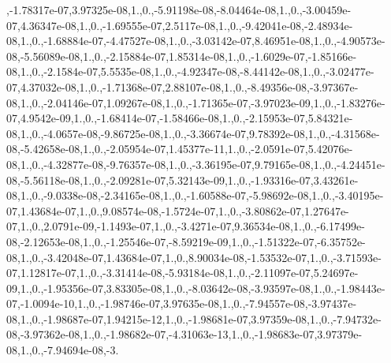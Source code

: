 \begin{DoxyCompactItemize}
,-\/1.\-78317e-\/07,3.\-97325e-\/08,1.,0.,-\/5.\-91198e-\/08,-\/8.\-04464e-\/08,1.,0.,-\/3.\-00459e-\/07,4.\-36347e-\/08,1.,0.,-\/1.\-69555e-\/07,2.\-5117e-\/08,1.,0.,-\/9.\-42041e-\/08,-\/2.\-48934e-\/08,1.,0.,-\/1.\-68884e-\/07,-\/4.\-47527e-\/08,1.,0.,-\/3.\-03142e-\/07,8.\-46951e-\/08,1.,0.,-\/4.\-90573e-\/08,-\/5.\-56089e-\/08,1.,0.,-\/2.\-15884e-\/07,1.\-85314e-\/08,1.,0.,-\/1.\-6029e-\/07,-\/1.\-85166e-\/08,1.,0.,-\/2.\-1584e-\/07,5.\-5535e-\/08,1.,0.,-\/4.\-92347e-\/08,-\/8.\-44142e-\/08,1.,0.,-\/3.\-02477e-\/07,4.\-37032e-\/08,1.,0.,-\/1.\-71368e-\/07,2.\-88107e-\/08,1.,0.,-\/8.\-49356e-\/08,-\/3.\-97367e-\/08,1.,0.,-\/2.\-04146e-\/07,1.\-09267e-\/08,1.,0.,-\/1.\-71365e-\/07,-\/3.\-97023e-\/09,1.,0.,-\/1.\-83276e-\/07,4.\-9542e-\/09,1.,0.,-\/1.\-68414e-\/07,-\/1.\-58466e-\/08,1.,0.,-\/2.\-15953e-\/07,5.\-84321e-\/08,1.,0.,-\/4.\-0657e-\/08,-\/9.\-86725e-\/08,1.,0.,-\/3.\-36674e-\/07,9.\-78392e-\/08,1.,0.,-\/4.\-31568e-\/08,-\/5.\-42658e-\/08,1.,0.,-\/2.\-05954e-\/07,1.\-45377e-\/11,1.,0.,-\/2.\-0591e-\/07,5.\-42076e-\/08,1.,0.,-\/4.\-32877e-\/08,-\/9.\-76357e-\/08,1.,0.,-\/3.\-36195e-\/07,9.\-79165e-\/08,1.,0.,-\/4.\-24451e-\/08,-\/5.\-56118e-\/08,1.,0.,-\/2.\-09281e-\/07,5.\-32143e-\/09,1.,0.,-\/1.\-93316e-\/07,3.\-43261e-\/08,1.,0.,-\/9.\-0338e-\/08,-\/2.\-34165e-\/08,1.,0.,-\/1.\-60588e-\/07,-\/5.\-98692e-\/08,1.,0.,-\/3.\-40195e-\/07,1.\-43684e-\/07,1.,0.,9.\-08574e-\/08,-\/1.\-5724e-\/07,1.,0.,-\/3.\-80862e-\/07,1.\-27647e-\/07,1.,0.,2.\-0791e-\/09,-\/1.\-1493e-\/07,1.,0.,-\/3.\-4271e-\/07,9.\-36534e-\/08,1.,0.,-\/6.\-17499e-\/08,-\/2.\-12653e-\/08,1.,0.,-\/1.\-25546e-\/07,-\/8.\-59219e-\/09,1.,0.,-\/1.\-51322e-\/07,-\/6.\-35752e-\/08,1.,0.,-\/3.\-42048e-\/07,1.\-43684e-\/07,1.,0.,8.\-90034e-\/08,-\/1.\-53532e-\/07,1.,0.,-\/3.\-71593e-\/07,1.\-12817e-\/07,1.,0.,-\/3.\-31414e-\/08,-\/5.\-93184e-\/08,1.,0.,-\/2.\-11097e-\/07,5.\-24697e-\/09,1.,0.,-\/1.\-95356e-\/07,3.\-83305e-\/08,1.,0.,-\/8.\-03642e-\/08,-\/3.\-93597e-\/08,1.,0.,-\/1.\-98443e-\/07,-\/1.\-0094e-\/10,1.,0.,-\/1.\-98746e-\/07,3.\-97635e-\/08,1.,0.,-\/7.\-94557e-\/08,-\/3.\-97437e-\/08,1.,0.,-\/1.\-98687e-\/07,1.\-94215e-\/12,1.,0.,-\/1.\-98681e-\/07,3.\-97359e-\/08,1.,0.,-\/7.\-94732e-\/08,-\/3.\-97362e-\/08,1.,0.,-\/1.\-98682e-\/07,-\/4.\-31063e-\/13,1.,0.,-\/1.\-98683e-\/07,3.\-97379e-\/08,1.,0.,-\/7.\-94694e-\/08,-\/3.
\end{DoxyCompactItemize}
